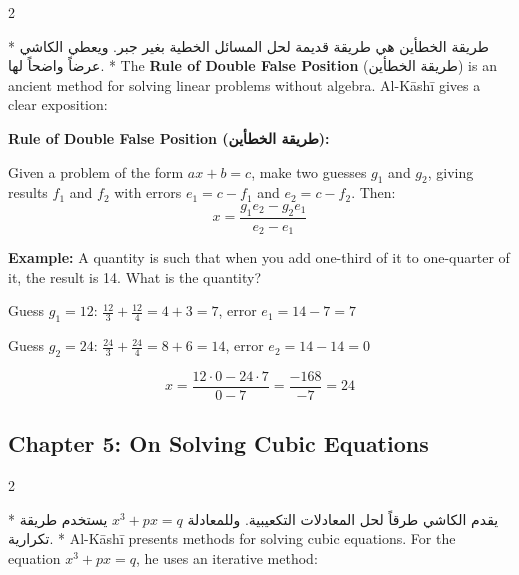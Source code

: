 \documentclass[11pt,a4paper]{article}
\newcommand{\ar}[1]{{\arabicfont\beginR #1\endR}}
\newenvironment{bilingual}{%
  \vspace{0.3em}%
  \begin{paracol}{2}%
}{%
  \end{paracol}%
  \vspace{0.3em}%
}
\newenvironment{mathalgo}{%
  \par\vspace{0.3cm}
  \begin{framed}
  \setlength{\parindent}{0pt}
}{%
  \end{framed}
  \par\vspace{0.3cm}
}
\begin{document}
\begin{bilingual}
\switchcolumn[0]*
\ar{طريقة الخطأين هي طريقة قديمة لحل المسائل الخطية بغير جبر. ويعطي الكاشي عرضاً واضحاً لها.}
\switchcolumn[1]*
The \textbf{Rule of Double False Position} (\ar{طريقة الخطأين}) is an
ancient method for solving linear problems without algebra. Al-K\=ash\=i
gives a clear exposition:
\end{bilingual}

\begin{mathalgo}
\textbf{Rule of Double False Position (\ar{طريقة الخطأين}):}

Given a problem of the form $ax + b = c$, make two guesses $g_1$ and
$g_2$, giving results $f_1$ and $f_2$ with errors $e_1 = c - f_1$ and
$e_2 = c - f_2$. Then:
\[
x = \frac{g_1 e_2 - g_2 e_1}{e_2 - e_1}
\]

\textbf{Example:} A quantity is such that when you add one-third of it
  to one-quarter of it, the result is 14. What is the quantity?

Guess $g_1 = 12$: $\frac{12}{3} + \frac{12}{4} = 4 + 3 = 7$, error $e_1
= 14 - 7 = 7$

Guess $g_2 = 24$: $\frac{24}{3} + \frac{24}{4} = 8 + 6 = 14$, error $e_2
= 14 - 14 = 0$

\[
x = \frac{12 \cdot 0 - 24 \cdot 7}{0 - 7} = \frac{-168}{-7} = 24
\]
\end{mathalgo}

\subsection{Chapter 5: On Solving Cubic Equations}

\begin{bilingual}
\switchcolumn[0]*
\ar{يقدم الكاشي طرقاً لحل المعادلات التكعيبية. وللمعادلة $x^3 + px = q$ يستخدم طريقة تكرارية.}
\switchcolumn[1]*
Al-K\=ash\=i presents methods for solving cubic equations. For the equation
$x^3 + px = q$, he uses an iterative method:
\end{bilingual}
\end{document}
